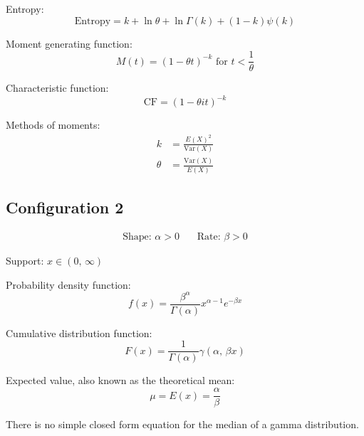 \documentclass[12pt]{article}
\begin{document}
Entropy:
\begin{equation}\label{eq:gamma-entropy-1}
	\text{Entropy} = k + \ln{\theta} + \ln{\Gamma(k)} + (1-k)\psi(k)
\end{equation}

Moment generating function:
\begin{equation}\label{eq:gamma-mgf-1}
	M(t) = (1-\theta t)^{-k}\text{ for }t < \frac{1}{\theta} 
\end{equation}

Characteristic function:
\begin{equation}\label{eq:gamma-cf-1}
	\text{CF} = (1-\theta it)^{-k}
\end{equation}

Methods of moments:
\begin{equation}\label{eq:gamma-mom-1}
	\begin{split}
		k		&=	\frac{E(X)^2}{\text{Var}(X)}\\
		\theta	&=	\frac{\text{Var}(X)}{E(X)}
	\end{split}
\end{equation}

\pagebreak
\subsection{Configuration 2}
\begin{align*}
	\text{Shape: } \alpha>0&&\, \text{Rate: }\beta>0
\end{align*}

Support: $x\in (0,\,\infty)$

Probability density function:
\begin{equation}\label{eq:gamma-pdf-2}
	f(x) = \frac{\beta^\alpha}{\Gamma(\alpha)}x^{\alpha-1}e^{-\beta x}
\end{equation}

Cumulative distribution function:
\begin{equation}\label{eq:gamma-cdf-2}
	F(x) = \frac{1}{\Gamma(\alpha)}\gamma(\alpha,\, \beta x)
\end{equation}

Expected value, also known as the theoretical mean:
\begin{equation}\label{eq:gamma-expected-value-2}
	\mu = E(x) = \frac{\alpha}{\beta}
\end{equation}

There is no simple closed form equation for the median of a gamma distribution.
\end{document}
